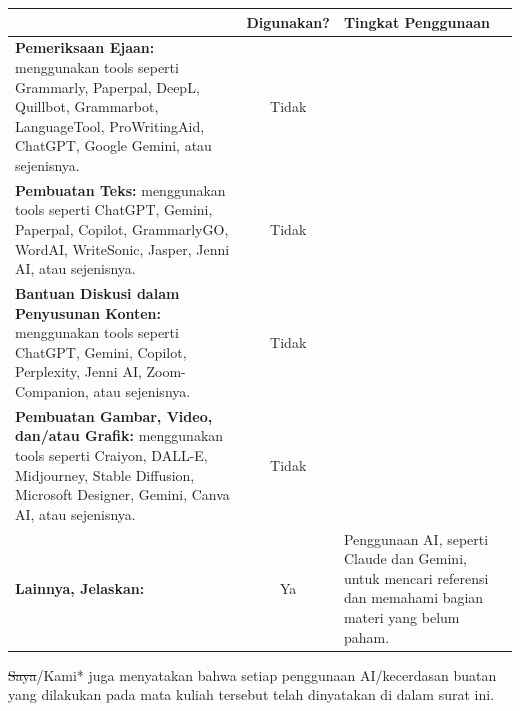 \vspace{0.4em}
\begin{table}[H]
    \centering
    \footnotesize
    \renewcommand{\arraystretch}{1.1}
    \begin{tabularx}{\textwidth}{|>{\raggedright\arraybackslash}X|c|>{\centering\arraybackslash}p{5.2cm}|}
        \hline
        \multicolumn{1}{|c|}{\textbf{Lingkup Pekerjaan}} & \textbf{Digunakan?} & \textbf{Tingkat Penggunaan} \\
        \hline
        \textbf{Pemeriksaan Ejaan:} menggunakan tools seperti Grammarly, Paperpal, DeepL,
        Quillbot, Grammarbot, LanguageTool, ProWritingAid, ChatGPT, Google Gemini,
        atau sejenisnya. & Tidak & \\
        \hline
        \textbf{Pembuatan Teks:} menggunakan tools seperti ChatGPT, Gemini, Paperpal,
        Copilot, GrammarlyGO, WordAI, WriteSonic, Jasper, Jenni AI, atau sejenisnya. & Tidak & \\
        \hline
        \textbf{Bantuan Diskusi dalam Penyusunan Konten:} menggunakan tools seperti
        ChatGPT, Gemini, Copilot, Perplexity, Jenni AI, Zoom-Companion, atau sejenisnya. & Tidak & \\
        \hline
        \textbf{Pembuatan Gambar, Video, dan/atau Grafik:} menggunakan tools seperti
        Craiyon, DALL-E, Midjourney, Stable Diffusion, Microsoft Designer, Gemini, Canva AI,
        atau sejenisnya. & Tidak & \\
        \hline
        \textbf{Lainnya, Jelaskan:}\vspace{1.6em} & Ya & Penggunaan AI, seperti Claude dan Gemini, untuk mencari referensi dan memahami bagian materi yang belum paham. \\
        \hline
    \end{tabularx}
\end{table}

\noindent \sout{Saya}/Kami* juga menyatakan bahwa setiap penggunaan AI/kecerdasan buatan yang
dilakukan pada mata kuliah tersebut telah dinyatakan di dalam surat ini.

